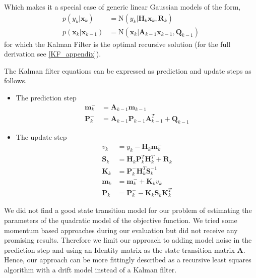 Which makes it a special case of generic linear Gaussian
models of the form, 
\begin{align*}
  p(y_k | \mathbf{x}_k) &= \text{N}(y_k | \mathbf{H}_k \mathbf{x}_k,
                          \mathbf{R}_k) \\
  p(\mathbf{x}_k | \mathbf{x}_{k-1}) &= \text{N}(\mathbf{x}_k
                                      | \mathbf{A}_{k-1} \mathbf{x}_{k-1},
                                      \mathbf{Q}_{k-1})
\end{align*}
for which the Kalman Filter \citep{Kalman:1960} is the optimal recursive solution
(for the full derivation see  \cref{KF_appendix}).

The Kalman filter equations can be expressed as
prediction and update steps as follows.
\begin{itemize}
\item The prediction step
  \begin{equation}
    \label{KF_prediction}
    \begin{aligned}
      \mathbf{m}_k^- &= \mathbf{A}_{k-1} \mathbf{m}_{k-1} \\
      \mathbf{P}_k^- &= \mathbf{A}_{k-1} \mathbf{P}_{k-1} \mathbf{A}^T_{k-1}
      + \mathbf{Q}_{k-1}
    \end{aligned}
  \end{equation}

\item The update step
  \begin{equation}
    \label{KF_update}
    \begin{aligned}
      v_k &= y_k - \mathbf{H}_k \mathbf{m}_k^- \\
      \mathbf{S}_k &= \mathbf{H}_k \mathbf{P}_k^T \mathbf{H}^T_k +
      \mathbf{R}_k \\
      \mathbf{K}_k &= \mathbf{P}_k^- \mathbf{H}_k^T \mathbf{S}_k^{-1} \\
      \mathbf{m}_k &= \mathbf{m}_k^- + \mathbf{K}_k v_k \\
      \mathbf{P}_k &= \mathbf{P}_k^- - \mathbf{K}_k \mathbf{S}_k \mathbf{K}_k^T
    \end{aligned}
  \end{equation}
\end{itemize}


We did not find a good state transition model for our problem of
estimating the parameters of the quadratic model of the objective function.
We tried some momentum based approaches during our evaluation but
did not receive any promising results. Therefore we limit our approach to
adding model noise in the prediction step and
using an Identity matrix as the state transition matrix $\mathbf{A}$.
Hence, our approach can be more fittingly described as
a recursive least squares algorithm with a drift model instead of a Kalman filter.
